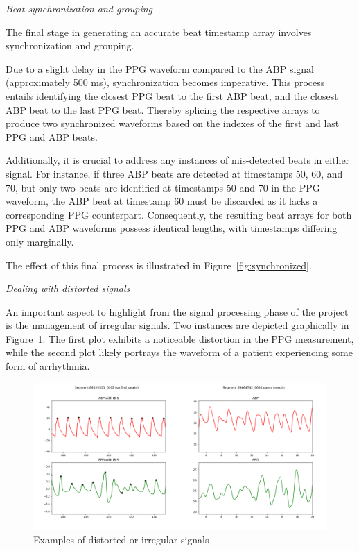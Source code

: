 \textit{Beat synchronization and grouping}
\vspace{0.1cm}

The final stage in generating an accurate beat timestamp array involves synchronization and grouping.

Due to a slight delay in the PPG waveform compared to the ABP signal (approximately 500 ms), synchronization becomes imperative.
This process entails identifying the closest PPG beat to the first ABP beat, and the closest ABP beat to the last PPG beat.
Thereby splicing the respective arrays to produce two synchronized waveforms based on the indexes of the first and last PPG and ABP beats.

Additionally, it is crucial to address any instances of mis-detected beats in either signal.
For instance, if three ABP beats are detected at timestamps 50, 60, and 70, but only two beats are identified at timestamps 50 and 70 in the PPG waveform,
the ABP beat at timestamp 60 must be discarded as it lacks a corresponding PPG counterpart.
Consequently, the resulting beat arrays for both PPG and ABP waveforms possess identical lengths, with timestamps differing only marginally.

The effect of this final process is illustrated in Figure~\ref{fig:synchronized}.

\vspace{0.2cm}
\textit{Dealing with distorted signals}
\vspace{0.2cm}

An important aspect to highlight from the signal processing phase of the project is the management of irregular signals.
Two instances are depicted graphically in Figure~\ref{fig:distorted}.
The first plot exhibits a noticeable distortion in the PPG measurement, while the second plot likely portrays the waveform of a patient experiencing some form of arrhythmia.

\begin{figure}[h]
    \includegraphics[width=\textwidth]{images/methods/cringe_signals}
    \vspace{-1.2cm}
    \captionsetup{format=plain, justification=centering, font=small}
    \caption{Examples of distorted or irregular signals}
    \label{fig:distorted}
\end{figure}


